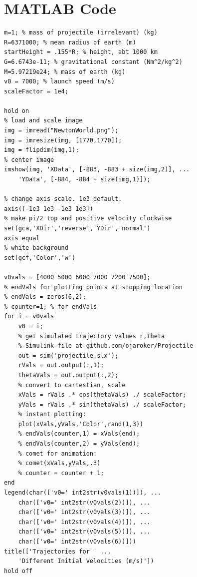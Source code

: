 \documentclass[aps,twocolumn]{revtex4-1}
\begin{document}
\section{MATLAB Code}
\begin{verbatim}
m=1; % mass of projectile (irrelevant) (kg)
R=6371000; % mean radius of earth (m)
startHeight = .155*R; % height, abt 1000 km
G=6.6743e-11; % gravitational constant (Nm^2/kg^2)
M=5.97219e24; % mass of earth (kg)
v0 = 7000; % launch speed (m/s)
scaleFactor = 1e4;

hold on
% load and scale image
img = imread("NewtonWorld.png");
img = imresize(img, [1770,1770]);
img = flipdim(img,1);
% center image
imshow(img, 'XData', [-883, -883 + size(img,2)], ...
    'YData', [-884, -884 + size(img,1)]);

% change axis scale. 1e3 default.
axis([-1e3 1e3 -1e3 1e3])
% make pi/2 top and positive velocity clockwise
set(gca,'XDir','reverse','YDir','normal') 
axis equal
% white background
set(gcf,'Color','w')

v0vals = [4000 5000 6000 7000 7200 7500];
% endVals for plotting points at stopping location
% endVals = zeros(6,2);
% counter=1; % for endVals
for i = v0vals
    v0 = i;
    % get simulated trajectory values r,theta
    % Simulink file at github.com/ojaroker/Projectile
    out = sim('projectile.slx');
    rVals = out.output(:,1);
    thetaVals = out.output(:,2);
    % convert to cartestian, scale
    xVals = rVals .* cos(thetaVals) ./ scaleFactor;
    yVals = rVals .* sin(thetaVals) ./ scaleFactor;
    % instant plotting:
    plot(xVals,yVals,'Color',rand(1,3))
    % endVals(counter,1) = xVals(end);
    % endVals(counter,2) = yVals(end);
    % comet for animation:
    % comet(xVals,yVals,.3)
    % counter = counter + 1;
end
legend(char(['v0=' int2str(v0vals(1))]), ...
    char(['v0=' int2str(v0vals(2))]), ...
    char(['v0=' int2str(v0vals(3))]), ...
    char(['v0=' int2str(v0vals(4))]), ...
    char(['v0=' int2str(v0vals(5))]), ...
    char(['v0=' int2str(v0vals(6))]))
title(['Trajectories for ' ...
    'Different Initial Velocities (m/s)'])
hold off
\end{verbatim}
\end{document}
